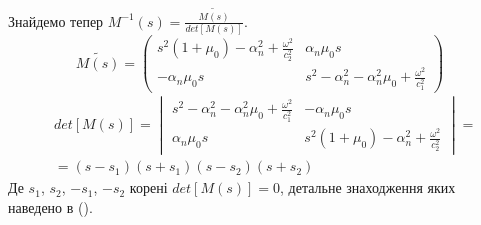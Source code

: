 Знайдемо тепер $M^{-1}(s) = \frac{\widetilde{M(s)}}{det[M(s)]}$.
\begin{equation}
    \widetilde{M(s)} = \begin{pmatrix}
        s^2 (1 + \mu_0) -\alpha_n^2 + \frac{\omega^2}{c_2^2} & \alpha_n \mu_0 s \\
        -\alpha_n \mu_0 s & s^2 - \alpha_n^2 - \alpha_n^2\mu_0 + \frac{\omega^2}{c_1^2}
     \end{pmatrix}
\end{equation}
\begin{align}
    &det[M(s)] = \begin{vmatrix}
        s^2 - \alpha_n^2 - \alpha_n^2\mu_0 + \frac{\omega^2}{c_1^2} & -\alpha_n \mu_0 s \\
        \alpha_n \mu_0 s & s^2 (1 + \mu_0) -\alpha_n^2 + \frac{\omega^2}{c_2^2}
     \end{vmatrix} = \nonumber \\
    &=(s - s_1)(s + s_1)(s - s_2)(s + s_2)
\end{align}
Де $s_1$, $s_2$, $-s_1$, $-s_2$ корені $det[M(s)]=0$, детальне знаходження яких наведено в ().

